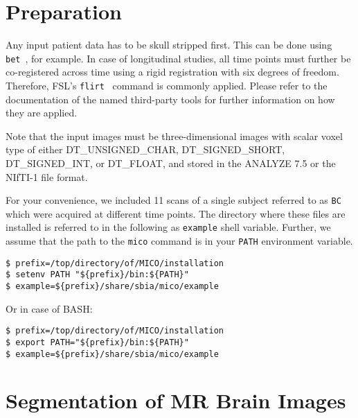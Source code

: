 \documentclass[a4paper,12pt]{article}
\begin{document}
\section{Preparation}
\label{data}

Any input patient data has to be skull stripped first. This can be done using
\texttt{bet}~\cite{bet}, for example. In case of longitudinal studies,
all time points must further be co-registered across time using a rigid
registration with six degrees of freedom. Therefore, FSL's
\texttt{flirt}~\cite{flirt} command is commonly applied.
Please refer to the documentation of the named third-party tools for further
information on how they are applied.

Note that the input images must be three-dimensional images with scalar voxel
type of either DT{\_}UNSIGNED{\_}CHAR, DT{\_}SIGNED{\_}SHORT, DT{\_}SIGNED{\_}INT,
or DT{\_}FLOAT, and stored in the ANALYZE 7.5 or the NIfTI-1 file format.

\pagebreak

For your convenience, we included 11 scans of a single subject referred to
as \texttt{BC} which were acquired at different time points.
The directory where these files are installed is referred to in the following
as \texttt{example} shell variable. Further, we assume that the path to the
\texttt{mico} command is in your \texttt{PATH} environment variable.
\footnotesize
\begin{verbatim}
$ prefix=/top/directory/of/MICO/installation
$ setenv PATH "${prefix}/bin:${PATH}"
$ example=${prefix}/share/sbia/mico/example
\end{verbatim}
\normalsize
Or in case of BASH:
\footnotesize
\begin{verbatim}
$ prefix=/top/directory/of/MICO/installation
$ export PATH="${prefix}/bin:${PATH}"
$ example=${prefix}/share/sbia/mico/example
\end{verbatim}
\normalsize

\section{Segmentation of MR Brain Images}
\label{3d}
\end{document}
